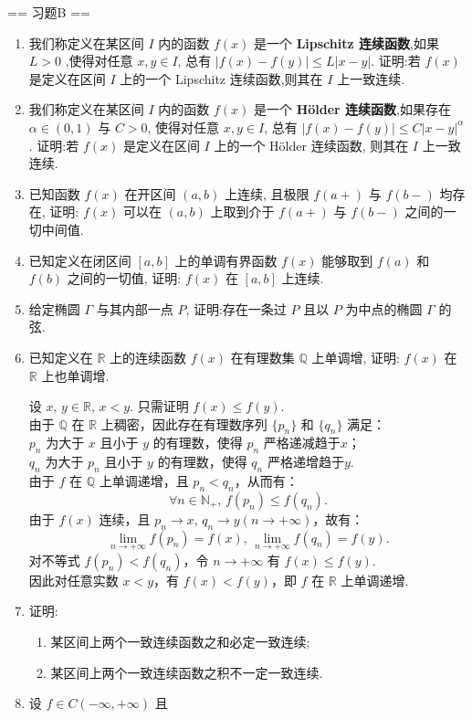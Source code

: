 == 习题B ==

\begin{enumerate}
    \item[1.]我们称定义在某区间 $I$ 内的函数 $f(x)$ 是一个 \textbf{Lipschitz 连续函数},如果 $L > 0$ ,使得对任意 $x,y\in I$, 总有 $\displaystyle|f(x) - f(y)|\leq L|x - y|$. 
    证明:若 $f(x)$ 是定义在区间 $I$ 上的一个 Lipschitz 连续函数,则其在 $I$ 上一致连续.
    \item[2.]我们称定义在某区间 $I$ 内的函数 $f(x)$ 是一个 \textbf{Hölder 连续函数},如果存在 $\alpha \in (0,1)$ 与 $C > 0$, 使得对任意 $x,y\in I$, 总有 $\displaystyle|f(x) - f(y)|\leq C|x - y|^{\alpha}$. 
    证明:若 $f(x)$ 是定义在区间 $I$ 上的一个 Hölder 连续函数, 则其在 $I$ 上一致连续.
    \item[3.]已知函数 $f(x)$ 在开区间 $(a,b)$ 上连续, 且极限 $f(a + )$ 与 $f(b - )$ 均存在, 证明: $f(x)$ 可以在 $(a,b)$ 上取到介于 $f(a + )$ 与 $f(b - )$ 之间的一切中间值.
    \item[4.]已知定义在闭区间 $[a, b]$ 上的单调有界函数 $f(x)$ 能够取到 $f(a)$ 和 $f(b)$ 之间的一切值, 证明: $f(x)$ 在 $[a, b]$ 上连续.
    \item[5.]给定椭圆 $\Gamma$ 与其内部一点 $P$, 证明:存在一条过 $P$ 且以 $P$ 为中点的椭圆 $\Gamma$ 的弦.
    \item[6.]已知定义在 $\mathbb{R}$ 上的连续函数 $f(x)$ 在有理数集 $\mathbb{Q}$ 上单调增, 证明: $f(x)$ 在 $\mathbb{R}$ 上也单调增.
    \begin{solution}
        设 $x,\,y\in\mathbb{R},\,x<y$. 只需证明 $f(x)\leq f(y)$.\\
        由于 $\mathbb{Q}$ 在 $\mathbb{R}$ 上稠密，因此存在有理数序列 $\{p_{n}\}$ 和 $\{q_{n}\}$ 满足：\\
        $p_{n}$ 为大于 $x$ 且小于 $y$ 的有理数，使得 $p_{n}$ 严格递减趋于$x$；\\
        $q_{n}$ 为大于 $p_{n}$ 且小于 $y$ 的有理数，使得 $q_{n}$ 严格递增趋于$y$.\\
        由于 $f$ 在 $\mathbb{Q}$ 上单调递增，且 $p_{n}<q_{n}$，从而有：
        \[
        \forall n\in\mathbb{N}_{+},\,f(p_{n})\leq f(q_{n}).
        \]
        由于 $f(x)$ 连续，且 $p_{n}\to x,\,q_{n}\to y(n\to +\infty)$，故有：
        \[
        \lim_{n\to+\infty}f(p_{n})=f(x),\,\lim_{n\to+\infty}f(q_{n})=f(y).
        \]
        对不等式 $f(p_{n})<f(q_{n})$，令 $n\to +\infty$ 有 $f(x)\leq f(y)$.\\
        因此对任意实数 $x<y$，有 $f(x)<f(y)$，即 $f$ 在 $\mathbb{R}$ 上单调递增.
    \end{solution}
    \item[7.]证明:
    \begin{enumerate}
        \item[(a)]某区间上两个一致连续函数之和必定一致连续;
        \item[(b)]某区间上两个一致连续函数之积不一定一致连续.
    \end{enumerate}
    \item[8.]设 $f \in C(-\infty , +\infty)$ 且


\end{enumerate}
